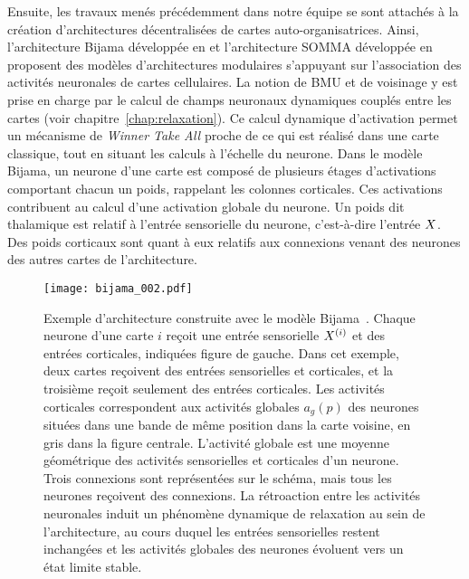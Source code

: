 \documentclass[../main]{subfiles}
\begin{document}
Ensuite, les travaux menés précédemment dans notre équipe se sont attachés à la création d'architectures décentralisées de cartes auto-organisatrices.
Ainsi, l'architecture Bijama développée en \cite{menard05} et l'architecture SOMMA développée en \cite{lefort_unlearning_2011} proposent des modèles d'architectures modulaires s'appuyant sur l'association des activités neuronales de cartes cellulaires. La notion de BMU et de voisinage y est prise en charge par le calcul de champs neuronaux dynamiques couplés entre les cartes (voir chapitre~\ref{chap:relaxation}). Ce calcul dynamique d'activation permet un mécanisme de \emph{Winner Take All} proche de ce qui est réalisé dans une carte classique, tout en situant les calculs à l'échelle du neurone.
Dans le modèle Bijama, un neurone d'une carte est composé de plusieurs étages d'activations comportant chacun un poids, rappelant les colonnes corticales. Ces activations contribuent au calcul d'une activation globale du neurone.
Un poids dit thalamique est relatif à l'entrée sensorielle du neurone, c'est-à-dire l'entrée $X$.
Des poids corticaux sont quant à eux relatifs aux connexions venant des neurones des autres cartes de l'architecture.

\begin{figure}
    \centering
    \texttt{[image: bijama\_002.pdf]}
    \caption{Exemple d'architecture construite avec le modèle Bijama~\parencite{menard05}.
    Chaque neurone d'une carte $i$ reçoit une entrée sensorielle $X^{({i})}$ et des entrées corticales, indiquées figure de gauche.
    Dans cet exemple, deux cartes reçoivent des entrées sensorielles et corticales, et la troisième reçoit seulement des entrées corticales.
    Les activités corticales correspondent aux activités globales $a_g(p)$ des neurones situées dans une bande de même position dans la carte voisine, en gris dans la figure centrale. L'activité globale est une moyenne géométrique des activités sensorielles et corticales d'un neurone.
    Trois connexions sont représentées sur le schéma, mais tous les neurones reçoivent des connexions.
    La rétroaction entre les activités neuronales induit un phénomène dynamique de relaxation au sein de l'architecture, au cours duquel les entrées sensorielles restent inchangées et les activités globales des neurones évoluent vers un état limite stable. \label{fig:bijama}}
\end{figure}
\end{document}
